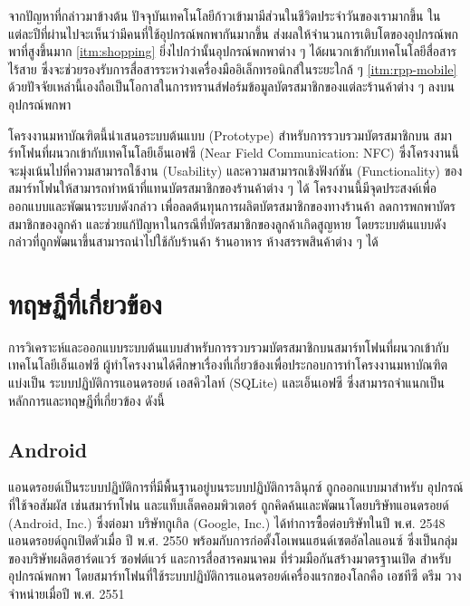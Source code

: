 \documentclass[a4paper]{article}
\begin{document}
จากปัญหาที่กล่าวมาข้างต้น ปัจจุบันเทคโนโลยีก้าวเข้ามามีส่วนในชีวิตประจำวันของเรามากขึ้น ในแต่ละปีที่ผ่านไปจะเห็นว่ามีคนที่ใช้อุปกรณ์พกพากันมากขึ้น ส่งผลให้จำนวนการเติบโตของอุปกรณ์พกพาที่สูงขึ้นมาก \ref{itm:shopping} ยิ่งไปกว่านั้นอุปกรณ์พกพาต่าง ๆ ได้ผนวกเข้ากับเทคโนโลยีสื่อสารไร้สาย ซึ่งจะช่วยรองรับการสื่อสารระหว่างเครื่องมืออิเล็กทรอนิกส์ในระยะใกล้ ๆ \ref{itm:rpp-mobile} ด้วยปัจจัยเหล่านี้เองถือเป็นโอกาสในการทรานส์ฟอร์มข้อมูลบัตรสมาชิกของแต่ละร้านค้าต่าง ๆ ลงบนอุปกรณ์พกพา 

โครงงานมหาบัณฑิตนี้นำเสนอระบบต้นแบบ (Prototype) สำหรับการรวบรวมบัตรสมาชิกบน \newline สมาร์ทโฟนที่ผนวกเข้ากับเทคโนโลยีเอ็นเอฟซี (Near Field Communication: NFC) ซึ่งโครงงานนี้จะมุ่งเน้นไปที่ความสามารถใช้งาน (Usability) และความสามารถเชิงฟังก์ชัน (Functionality) ของสมาร์ทโฟนให้สามารถทำหน้าที่แทนบัตรสมาชิกของร้านค้าต่าง ๆ ได้ โครงงานนี้มีจุดประสงค์เพื่อออกแบบและพัฒนาระบบดังกล่าว เพื่อลดต้นทุนการผลิตบัตรสมาชิกของทางร้านค้า ลดการพกพาบัตรสมาชิกของลูกค้า และช่วยแก้ปัญหาในกรณีที่บัตรสมาชิกของลูกค้าเกิดสูญหาย โดยระบบต้นแบบดังกล่าวที่ถูกพัฒนาขึ้นสามารถนำไปใช้กับร้านค้า ร้านอาหาร ห้างสรรพสินค้าต่าง ๆ ได้


\section{ทฤษฏีที่เกี่ยวข้อง}
การวิเคราะห์และออกแบบระบบต้นแบบสำหรับการรวบรวมบัตรสมาชิกบนสมาร์ทโฟนที่ผนวกเข้ากับเทคโนโลยีเอ็นเอฟซี ผู้ทำโครงงานได้ศึกษาเรื่องที่เกี่ยวข้องเพื่อประกอบการทําโครงงานมหาบัณฑิต แบ่งเป็น ระบบปฏิบัติการแอนดรอยด์ เอสคิวไลท์ (SQLite) และเอ็นเอฟซี ซึ่งสามารถจําแนกเป็นหลักการและทฤษฎีที่เกี่ยวข้อง ดังนี้

\subsection{Android}
แอนดรอยด์เป็นระบบปฏิบัติการที่มีพื้นฐานอยู่บนระบบปฏิบัติการลินุกซ์ ถูกออกแบบมาสำหรับ \newline อุปกรณ์ที่ใช้จอสัมผัส เช่นสมาร์ทโฟน และแท็บเล็ตคอมพิวเตอร์ ถูกคิดค้นและพัฒนาโดยบริษัทแอนดรอยด์ (Android, Inc.) ซึ่งต่อมา บริษัทกูเกิล (Google, Inc.) ได้ทำการซื้อต่อบริษัทในปี พ.ศ. 2548 แอนดรอยด์ถูกเปิดตัวเมื่อ ปี พ.ศ. 2550 พร้อมกับการก่อตั้งโอเพนแฮนด์เซตอัลไลแอนซ์ ซึ่งเป็นกลุ่มของบริษัทผลิตฮาร์ดแวร์ ซอฟต์แวร์ และการสื่อสารคมนาคม ที่ร่วมมือกันสร้างมาตรฐานเปิด สำหรับอุปกรณ์พกพา โดยสมาร์ทโฟนที่ใช้ระบบปฏิบัติการแอนดรอยด์เครื่องแรกของโลกคือ เอชทีซี ดรีม วางจำหน่ายเมื่อปี พ.ศ. 2551
\end{document}
